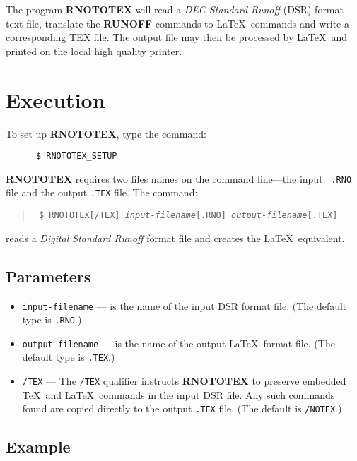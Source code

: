 The program {\bf RNOTOTEX} will read a {\em DEC Standard Runoff} (DSR) format
text file, translate the {\bf RUNOFF} commands to \LaTeX\ commands and write a
corresponding TEX file.  The output file may then be processed by \LaTeX\ and
printed on the local high quality printer.

\section{Execution}

To set up {\bf RNOTOTEX}, type the command:

\begin{verbatim}
      $ RNOTOTEX_SETUP
\end{verbatim}

{\bf RNOTOTEX} requires two files names on the command line---the input {\tt
.RNO} file and the output {\tt .TEX} file. The command:

\begin{quote}\tt
\$ RNOTOTEX[/TEX] {\it input-filename}[.RNO] {\it output-filename}[.TEX]
\end{quote}

reads a {\em Digital Standard Runoff} format file and creates the \LaTeX\
equivalent.

\subsection{Parameters}

\begin{itemize}

\item{\tt input-filename} --- is the name of the input DSR format file.
(The default type is {\tt .RNO}.)

\item{\tt output-filename} --- is the name of the output \LaTeX\ format file.
(The default type is {\tt .TEX}.)

\item{\tt /TEX} --- The {\tt /TEX} qualifier instructs {\bf RNOTOTEX} to
preserve embedded \TeX\ and \LaTeX\ commands in the input DSR file.  Any such
commands found are copied directly to the output {\tt .TEX} file. (The default
is {\tt /NOTEX}.)

\end{itemize}

\subsection{Example}


